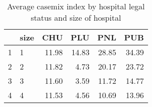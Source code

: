 \begin{table}[ht]
\centering
\begin{tabular}{rlrrrr}
  \hline
 & size & CHU & PLU & PNL & PUB \\ 
  \hline
1 & 1 & 11.98 & 14.83 & 28.85 & 34.39 \\ 
  2 & 2 & 11.82 & 4.73 & 20.17 & 23.72 \\ 
  3 & 3 & 11.60 & 3.59 & 11.72 & 14.77 \\ 
  4 & 4 & 11.53 & 4.56 & 10.69 & 13.96 \\ 
   \hline
\end{tabular}
\caption{Average casemix index by hospital legal status and size of hospital} 
\end{table}
